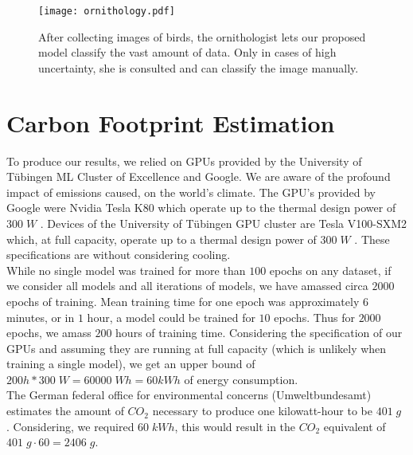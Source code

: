 \documentclass[a4paper,cleardoubleempty,BCOR1cm, 11pt]{report}
\begin{document}
\begin{figure}[t]
	\centering
	\texttt{[image: ornithology.pdf]}
	\caption[caption for ]{After collecting images of birds, the ornithologist lets our proposed model classify the vast amount of data. Only in cases of high uncertainty, she is consulted and can classify the image manually. \footnotemark}
	\label{fig:qual}
\end{figure}

\section{Carbon Footprint Estimation}
To produce our results, we relied on GPUs provided by the University of Tübingen ML Cluster of Excellence and Google. We are aware of the profound impact of emissions caused, on the world's climate.
The GPU's provided by Google were Nvidia Tesla K80 which operate up to the thermal design power of $300\;W$ \cite{nvidia2015tesla}. Devices of the University of Tübingen GPU cluster are Tesla V100-SXM2 which, at full capacity, operate up to a thermal design power of $300\;W$ \cite{nvidia2017tesla}. These specifications are without considering cooling.\\
While no single model was trained for more than $100$ epochs on any dataset, if we consider all models and all iterations of models, we have amassed circa $2000$ epochs of training. Mean training time for one epoch was approximately $6$ minutes, or in $1$ hour, a model could be trained for $10$ epochs. Thus for $2000$ epochs, we amass $200$ hours of training time. Considering the specification of our GPUs and assuming they are running at full capacity (which is unlikely when training a single model), we get an upper bound of $200h * 300\;W = 60000\;Wh=60kWh$ of energy consumption.\\
The German federal office for environmental concerns (Umweltbundesamt) estimates the amount of $CO_2$ necessary to produce one kilowatt-hour to be $401\;g$ \cite{icha2016entwicklung}. Considering, we required $60\;kWh$, this would result in the $CO_2$ equivalent of $401\;g \cdot 60 = 2406\;g$.

\end{document}
